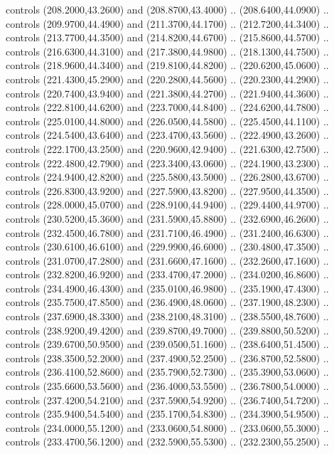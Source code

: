 {\begin{scope}[y=0.80pt, x=0.80pt, yscale=-1, xscale=1, inner sep=0pt, outer sep=0pt, #1]
      controls (208.2000,43.2600) and (208.8700,43.4000) .. (208.6400,44.0900) ..
      controls (209.9700,44.4900) and (211.3700,44.1700) .. (212.7200,44.3400) ..
      controls (213.7700,44.3500) and (214.8200,44.6700) .. (215.8600,44.5700) ..
      controls (216.6300,44.3100) and (217.3800,44.9800) .. (218.1300,44.7500) ..
      controls (218.9600,44.3400) and (219.8100,44.8200) .. (220.6200,45.0600) ..
      controls (221.4300,45.2900) and (220.2800,44.5600) .. (220.2300,44.2900) ..
      controls (220.7400,43.9400) and (221.3800,44.2700) .. (221.9400,44.3600) ..
      controls (222.8100,44.6200) and (223.7000,44.8400) .. (224.6200,44.7800) ..
      controls (225.0100,44.8000) and (226.0500,44.5800) .. (225.4500,44.1100) ..
      controls (224.5400,43.6400) and (223.4700,43.5600) .. (222.4900,43.2600) ..
      controls (222.1700,43.2500) and (220.9600,42.9400) .. (221.6300,42.7500) ..
      controls (222.4800,42.7900) and (223.3400,43.0600) .. (224.1900,43.2300) ..
      controls (224.9400,42.8200) and (225.5800,43.5000) .. (226.2800,43.6700) ..
      controls (226.8300,43.9200) and (227.5900,43.8200) .. (227.9500,44.3500) ..
      controls (228.0000,45.0700) and (228.9100,44.9400) .. (229.4400,44.9700) ..
      controls (230.5200,45.3600) and (231.5900,45.8800) .. (232.6900,46.2600) ..
      controls (232.4500,46.7800) and (231.7100,46.4900) .. (231.2400,46.6300) ..
      controls (230.6100,46.6100) and (229.9900,46.6000) .. (230.4800,47.3500) ..
      controls (231.0700,47.2800) and (231.6600,47.1600) .. (232.2600,47.1600) ..
      controls (232.8200,46.9200) and (233.4700,47.2000) .. (234.0200,46.8600) ..
      controls (234.4900,46.4300) and (235.0100,46.9800) .. (235.1900,47.4300) ..
      controls (235.7500,47.8500) and (236.4900,48.0600) .. (237.1900,48.2300) ..
      controls (237.6900,48.3300) and (238.2100,48.3100) .. (238.5500,48.7600) ..
      controls (238.9200,49.4200) and (239.8700,49.7000) .. (239.8800,50.5200) ..
      controls (239.6700,50.9500) and (239.0500,51.1600) .. (238.6400,51.4500) ..
      controls (238.3500,52.2000) and (237.4900,52.2500) .. (236.8700,52.5800) ..
      controls (236.4100,52.8600) and (235.7900,52.7300) .. (235.3900,53.0600) ..
      controls (235.6600,53.5600) and (236.4000,53.5500) .. (236.7800,54.0000) ..
      controls (237.4200,54.2100) and (237.5900,54.9200) .. (236.7400,54.7200) ..
      controls (235.9400,54.5400) and (235.1700,54.8300) .. (234.3900,54.9500) ..
      controls (234.0000,55.1200) and (233.0600,54.8000) .. (233.0600,55.3000) ..
      controls (233.4700,56.1200) and (232.5900,55.5300) .. (232.2300,55.2500) ..

\end{scope}}
